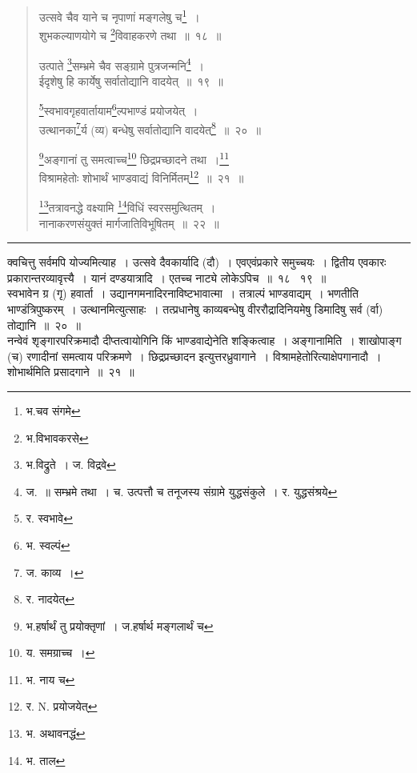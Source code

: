 \documentclass[11pt, openany]{book}
\begin{document}
\begin{quote}
{\na  उत्सवे चैव याने च नृपाणां मङ्गलेषु च\renewcommand{\thefootnote}{1}\footnote{भ.चव संगमे}~।\\
 शुभकल्याणयोगे च \renewcommand{\thefootnote}{2}\footnote{भ.विभावकरसे}विवाहकरणे तथा~॥~१८~॥

 उत्पाते \renewcommand{\thefootnote}{3}\footnote{भ.विद्रुते~। ज. विद्रवे}सम्भ्रमे चैव सङ्ग्रामे पुत्रजन्मनि\renewcommand{\thefootnote}{4}\footnote{ज.~॥  सम्भ्रमे तथा~। च. उत्पत्तौ च तनूजस्य संग्रामे युद्धसंकुले~। र. युद्धसंश्रये}~।\\
 ईदृशेषु हि कार्येषु सर्वातोद्यानि वादयेत्~॥~१९~॥

 \renewcommand{\thefootnote}{5}\footnote{र. स्वभावे}स्वभावगृहवार्तायाम\renewcommand{\thefootnote}{6}\footnote{भ. स्वल्पं}ल्पभाण्डं प्रयोजयेत्~।\\
 उत्थानका\renewcommand{\thefootnote}{7}\footnote{ज. काव्य~।}र्य (व्य) बन्धेषु सर्वातोद्यानि वादयेत्\renewcommand{\thefootnote}{8}\footnote{र. नादयेत्}~॥~२०~॥

 \renewcommand{\thefootnote}{9}\footnote{भ.हर्षार्थं तु प्रयोक्तृणां~। ज.हर्षार्थ मङ्गलार्थं च}अङ्गानां तु समत्वाच्च\renewcommand{\thefootnote}{10}\footnote{य. समग्राच्च~।} छिद्रप्रच्छादने तथा~।\renewcommand{\thefootnote}{11}\footnote{भ. नाय च}\\
 विश्रामहेतोः शोभार्थं भाण्डवाद्यं विनिर्मितम्\renewcommand{\thefootnote}{12}\footnote{र. N. प्रयोजयेत्}~॥~२१~॥

 \renewcommand{\thefootnote}{13}\footnote{भ. अथावनद्धं}तत्रावनद्धे वक्ष्यामि \renewcommand{\thefootnote}{14}\footnote{भ. ताल}विधिं स्वरसमुत्थितम्~।\\
 नानाकरणसंयुक्तं मार्गजातिविभूषितम्~॥~२२~॥}
\end{quote}

\hrule

\vspace{2mm}
क्वचित्तु सर्वमपि योज्यमित्याह~। उत्सवे दैवकार्यादि (दौ)~। एवएवंप्रकारे समुच्चयः~। द्वितीय एवकारः प्रकारान्तरव्यावृत्त्यै~। यानं दण्डयात्रादि~। एतच्च नाट्ये लोकेऽपिच~॥~१८ \textendash\ १९~॥\\

{\qtt स्वभावेन ग्र (गृ) हवार्ता}~। उद्यानगमनादिरनाविष्टभावात्मा~। तत्राल्पं भाण्डवाद्यम्~। भणतीति भाण्डंत्रिपुष्करम्~। उत्थानमित्युत्साहः~। तत्प्रधानेषु काव्यबन्धेषु वीररौद्रादिनियमेषु डिमादिषु सर्व (र्वा) तोद्यानि~॥~२०~॥\\

नन्वेवं शृङ्गारपरिक्रमादौ दीप्तत्वायोगिनि किं भाण्डवाद्येनेति शङ्कित्वाह~। {\qtt अङ्गानामिति}~। शाखोपाङ्ग (च) रणादीनां समत्वाय परिक्रमणे~। {\qtt छिद्रप्रच्छादन} इत्युत्तरध्रुवागाने~। विश्रामहेतोरित्याक्षेपगानादौ~। शोभार्थमिति प्रसादगाने~॥~२१~॥\\
\end{document}
